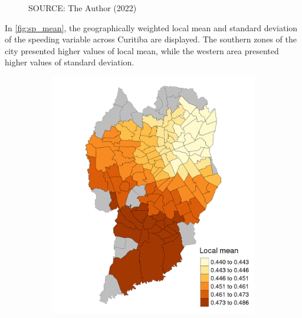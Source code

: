 \begin{figure}[!htbp]
\begin{subfigure}{0.5\textwidth}
    \end{subfigure}    
    \label{fig:r2_map}
    \par SOURCE: The Author (2022)
\end{figure}

In \autoref{fig:sp_mean}, the geographically weighted local mean and standard deviation of the speeding variable across Curitiba are displayed. The southern zones of the city presented higher values of local mean, while the western area presented higher values of standard deviation.


\begin{figure}[!htbp]
    \centering\footnotesize
    \captionsetup{font=footnotesize}
    \caption{SPEEDING GW LOCAL MEAN AND STD. DEVIATION}
    \begin{subfigure}{0.5\textwidth}
        \includegraphics{fig/summary_mean_sp.png}
    \end{subfigure}%
    \begin{subfigure}{0.5\textwidth}

\end{subfigure}
\end{figure}
